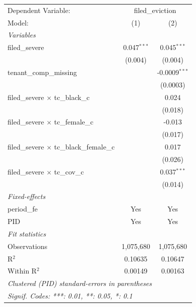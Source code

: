 \par\endgroup
\begingroup
\centering
\begin{tabular}{lcc}
   \tabularnewline \midrule \midrule
   Dependent Variable: & \multicolumn{2}{c}{filed\_eviction}\\
   Model:                                           & (1)           & (2)\\  
   \midrule
   \emph{Variables}\\
   filed\_severe                                    & 0.047$^{***}$ & 0.045$^{***}$\\   
                                                    & (0.004)       & (0.004)\\   
   tenant\_comp\_missing                            &               & -0.0009$^{***}$\\   
                                                    &               & (0.0003)\\   
   filed\_severe $\times$ tc\_black\_c              &               & 0.024\\   
                                                    &               & (0.018)\\   
   filed\_severe $\times$ tc\_female\_c             &               & -0.013\\   
                                                    &               & (0.017)\\   
   filed\_severe $\times$ tc\_black\_female\_c      &               & 0.017\\   
                                                    &               & (0.026)\\   
   filed\_severe $\times$ tc\_cov\_c                &               & 0.037$^{***}$\\   
                                                    &               & (0.014)\\   
   \midrule
   \emph{Fixed-effects}\\
   period\_fe                                       & Yes           & Yes\\  
   PID                                              & Yes           & Yes\\  
   \midrule
   \emph{Fit statistics}\\
   Observations                                     & 1,075,680     & 1,075,680\\  
   R$^2$                                            & 0.10635       & 0.10647\\  
   Within R$^2$                                     & 0.00149       & 0.00163\\  
   \midrule \midrule
   \multicolumn{3}{l}{\emph{Clustered (PID) standard-errors in parentheses}}\\
   \multicolumn{3}{l}{\emph{Signif. Codes: ***: 0.01, **: 0.05, *: 0.1}}\\
\end{tabular}
